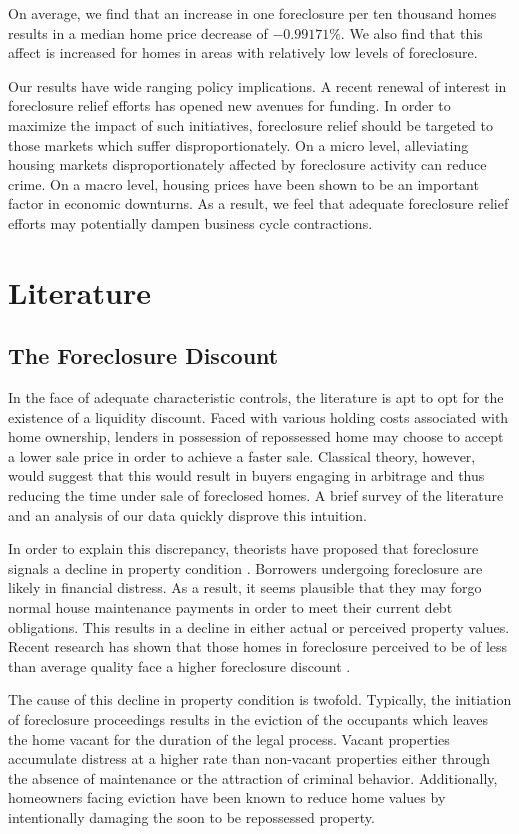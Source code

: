 \documentclass[12pt,oneside]{amsbook}
\begin{document}
On average, we find that an increase in one foreclosure per ten thousand homes results in a median home price decrease of $-0.99171\%$. We also find that this affect is increased for homes in areas with relatively low levels of foreclosure. 

	Our results have wide ranging policy implications. A recent renewal of interest in foreclosure relief efforts has opened new avenues for funding. In order to maximize the impact of such initiatives, foreclosure relief should be targeted to those markets which suffer disproportionately. On a micro level, alleviating housing markets disproportionately affected by foreclosure activity can reduce crime. On a macro level, housing prices have been shown to be an important factor in economic downturns\cite{paul}. As a result, we feel that adequate foreclosure relief efforts may potentially dampen business cycle contractions.

\section{Literature}\label{sec:lit}
\subsection{The Foreclosure Discount}
In the face of adequate characteristic controls, the literature is apt to opt for the existence of a liquidity discount. Faced with various holding costs associated with home ownership, lenders in possession of repossessed home may choose to accept a lower sale price in order to achieve a faster sale. Classical theory, however, would suggest that this would result in buyers engaging in arbitrage and thus reducing the time under sale of foreclosed homes. A brief survey of the literature and an analysis of our data quickly disprove this intuition. 

	In order to explain this discrepancy, theorists have proposed that foreclosure signals a decline in property condition \cite{Foote}. Borrowers undergoing foreclosure are likely in financial distress. As a result, it seems plausible that they may forgo normal house maintenance payments in order to meet their current debt obligations. This results in a decline in either actual or perceived property values. Recent research has shown that those homes in foreclosure perceived to be of less than average quality face a higher foreclosure discount \cite{Frame}. 
	
The cause of this decline in property condition is twofold. Typically, the initiation of foreclosure proceedings results in the eviction of the occupants which leaves the home vacant for the duration of the legal process. Vacant properties accumulate distress at a higher rate than non-vacant properties either through the absence of maintenance or the attraction of criminal behavior. Additionally, homeowners facing eviction have been known to reduce home values by intentionally damaging the soon to be repossessed property. 
\end{document}

